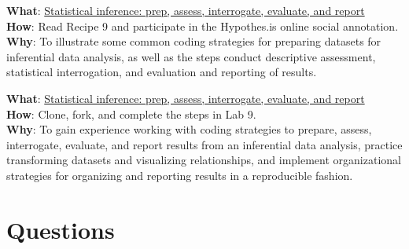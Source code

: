 \documentclass[
  letterpaper,
]{latex/krantz}
\begin{document}
\begin{tcolorbox}[enhanced jigsaw, toprule=.15mm, bottomtitle=1mm, coltitle=black, title=\textcolor{quarto-callout-tip-color}{\faLightbulb}\hspace{0.5em}{Recipe}, left=2mm, colframe=quarto-callout-tip-color-frame, bottomrule=.15mm, colbacktitle=quarto-callout-tip-color!10!white, leftrule=.75mm, colback=white, titlerule=0mm, breakable, toptitle=1mm, opacityback=0, arc=.35mm, rightrule=.15mm, opacitybacktitle=0.6]

\textbf{What}:
\href{https://lin380.github.io/tadr/articles/recipe_9.html}{Statistical
inference: prep, assess, interrogate, evaluate, and report}\\
\textbf{How}: Read Recipe 9 and participate in the Hypothes.is online
social annotation.\\
\textbf{Why}: To illustrate some common coding strategies for preparing
datasets for inferential data analysis, as well as the steps conduct
descriptive assessment, statistical interrogation, and evaluation and
reporting of results.

\end{tcolorbox}

\begin{tcolorbox}[enhanced jigsaw, toprule=.15mm, bottomtitle=1mm, coltitle=black, title=\textcolor{quarto-callout-tip-color}{\faLightbulb}\hspace{0.5em}{Lab}, left=2mm, colframe=quarto-callout-tip-color-frame, bottomrule=.15mm, colbacktitle=quarto-callout-tip-color!10!white, leftrule=.75mm, colback=white, titlerule=0mm, breakable, toptitle=1mm, opacityback=0, arc=.35mm, rightrule=.15mm, opacitybacktitle=0.6]

\textbf{What}: \href{https://github.com/lin380/lab_9}{Statistical
inference: prep, assess, interrogate, evaluate, and report}\\
\textbf{How}: Clone, fork, and complete the steps in Lab 9.\\
\textbf{Why}: To gain experience working with coding strategies to
prepare, assess, interrogate, evaluate, and report results from an
inferential data analysis, practice transforming datasets and
visualizing relationships, and implement organizational strategies for
organizing and reporting results in a reproducible fashion.

\end{tcolorbox}

\hypertarget{questions-7}{%
\section*{Questions}\label{questions-7}}
\end{document}
